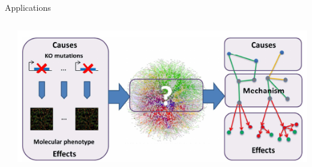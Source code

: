 \documentclass{beamer}
\begin{document}
\begin{frame}{Applications}
\begin{columns}[b]
\begin{column}{0.5\textwidth}
      {\small \cite{DBLP:conf/ilp/Corte-RealD017}}
    \end{column}
    \begin{column}{0.5\textwidth}
      \includegraphics[width=\textwidth]{application4.png}
      {\small \cite{de2013phenetic}}
    \end{column}
  \end{columns}
\end{frame}
\end{document}

